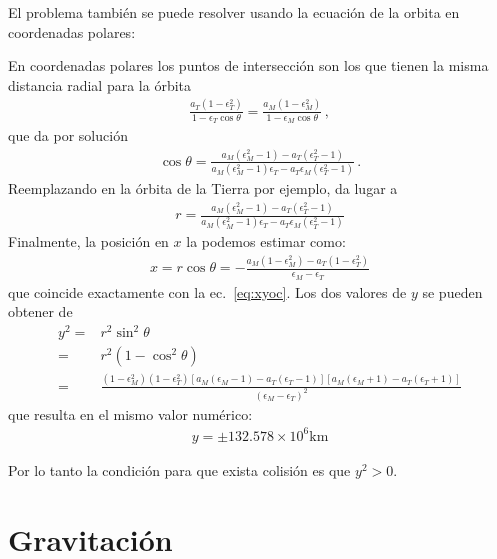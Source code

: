 El problema también se puede resolver usando la ecuación de la orbita en coordenadas polares:

En coordenadas polares los puntos de intersección son los que tienen la misma distancia radial para la órbita
\begin{align*}
  \frac{a_T \left(1-\epsilon _T^2\right)}{1-\epsilon_T\cos\theta }=  \frac{a_M \left(1-\epsilon_M^2\right)}{1-\epsilon _M\cos\theta }\,,
\end{align*}
que da por solución
\begin{align*}
\cos\theta= \frac{a_M \left(\epsilon_M^2-1\right)-a_T \left(\epsilon _T^2-1\right)}{a_M 
  \left(\epsilon_M^2-1\right) \epsilon_T-a_T \epsilon_M\left(\epsilon _T^2-1\right)}\,.
\end{align*}
Reemplazando en la órbita de la Tierra por ejemplo, da lugar a
\begin{align*}
  r=\frac{a_M \left(\epsilon_M^2-1\right)-a_T\left(\epsilon_T^2-1\right)}{a_M
    \left(\epsilon_M^2-1\right) \epsilon_T-a_T\epsilon_M\left(\epsilon _T^2-1\right)}
\end{align*}
Finalmente, la posición en $x$ la podemos estimar como:
\begin{align*}
  x=r\cos\theta=-\frac{a_M(1-\epsilon_M^2)-a_T(1-\epsilon_T^2)}{\epsilon_M-\epsilon_T}
\end{align*}
que coincide exactamente con la ec.~\eqref{eq:xyoc}. Los dos valores de $y$ se pueden obtener de
\begin{align*}
y^2=&r^2\sin^2\theta\nonumber\\
=&r^2(1-\cos^2\theta)\nonumber\\
=&  \frac{\left(1-\epsilon_M^2 \right)\left(1-\epsilon_T^2\right)\left[a_M \left(\epsilon_M-1\right)-a_T
   \left(\epsilon_T-1\right)\right] \left[a_M
   \left(\epsilon_M+1\right)-a_T \left(\epsilon_T+1\right)\right]}{
 \left(\epsilon_M-\epsilon_T\right)^2}
\end{align*}
que resulta en el mismo valor numérico:
\begin{align*}
  y=\pm{132.578\times10^{6}}\si{\kilo\meter}
\end{align*}

Por lo tanto la condición para que exista colisión es que $y^2>0$.

 
\section{Gravitación}

